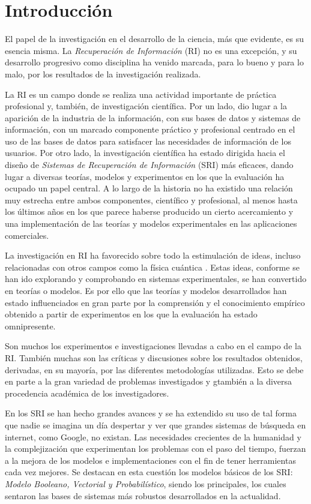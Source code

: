 \section{Introducción}\label{sec:intro}

El papel de la investigación en el desarrollo de la ciencia, más que evidente,
es su esencia misma. La \emph{Recuperación de Información} (RI)
no es una excepción, y su desarrollo progresivo como disciplina ha venido
marcada, para lo bueno y para lo malo, por los resultados de la investigación
realizada.\cite{chowdhury}

La RI es un campo donde se realiza una actividad importante de práctica
profesional y, también, de investigación científica. Por un lado, dio lugar a
la aparición de la industria de la información, con sus bases de datos y
sistemas de información, con un marcado componente práctico y profesional
centrado en el uso de las bases de datos para satisfacer las necesidades de
información de los usuarios. Por otro lado, la investigación científica ha
estado dirigida hacia el diseño de \emph{Sistemas de Recuperación de
Información} (SRI) más eficaces, dando lugar a diversas teorías, modelos y
experimentos en los que la evaluación ha ocupado un papel central. A lo largo
de la historia no ha existido una relación muy estrecha entre ambos
componentes, científico y profesional, al menos hasta los últimos años en los
que parece haberse producido un cierto acercamiento y una implementación de
las teorías y modelos experimentales en las aplicaciones comerciales.
\cite{ceri, borlund}

La investigación en RI ha favorecido sobre todo la estimulación de ideas, incluso
relacionadas con otros campos como la física cuántica \cite{piwowarski}. Estas
ideas, conforme se han ido explorando y comprobando en sistemas experimentales,
se han convertido en teorías o modelos. Es por ello que las teorías y
modelos desarrollados han estado influenciados en gran parte por la comprensión
y el conocimiento empírico obtenido a partir de experimentos en los que la
evaluación ha estado omnipresente.

Son muchos los experimentos e investigaciones llevadas a cabo en el campo de la
RI. También muchas son las críticas y discusiones sobre los resultados
obtenidos, derivadas, en su mayoría, por las diferentes metodologías
utilizadas. Esto se debe en parte a la gran variedad de problemas investigados
y gtambién a la diversa procedencia académica de los investigadores.
\cite{ellis}

En los SRI se han hecho grandes avances y se ha extendido su uso
de tal forma que nadie se imagina un día despertar y ver que grandes sistemas
de búsqueda en internet, como Google, no existan. Las necesidades crecientes
de la humanidad y la complejización que experimentan los problemas con el paso
del tiempo, fuerzan a la mejora de los modelos e implementaciones con el fin
de tener herramientas cada vez mejores. Se destacan en esta cuestión los
modelos básicos de los SRI: \emph{Modelo Booleano, Vectorial y Probabilístico},
siendo los principales, los cuales sentaron las bases de sistemas más robustos
desarrollados en la actualidad.


